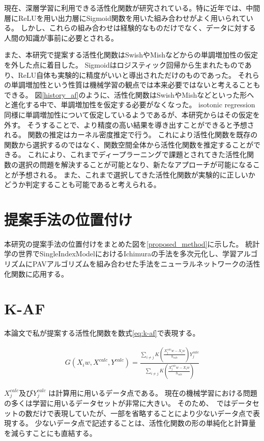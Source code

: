 現在、深層学習に利用できる活性化関数が研究されている。特に近年では、中間層にReLUを用い出力層にSigmoid関数を用いた組み合わせがよく用いられている。
しかし、これらの組み合わせは経験的なものだけでなく、データに対する人間の知識が事前に必要とされる。

また、本研究で提案する活性化関数はSwishやMishなどからの単調増加性の仮定を外した点に着目した。
Sigmoidはロジスティック回帰から生まれたものであり、ReLU自体も実験的に精度がいいと導出されただけのものであった。
それらの単調増加性という性質は機械学習の観点では本来必要ではないと考えることもできる。
図\ref{history_af}のように、活性化関数はSwishやMishなどといった形へと進化する中で、単調増加性を仮定する必要がなくなった。
isotonic regression同様に単調増加性について仮定しているようであるが、本研究からはその仮定を外す。
そうすることで、より精度の高い結果を導き出すことができると予想される。
関数の推定はカーネル密度推定で行う。
これにより活性化関数を既存の関数から選択するのではなく、関数空間全体から活性化関数を推定することができる。
これにより、これまでディープラーニングで課題とされてきた活性化関数の選択の問題を解決することが可能となり、新たなアプローチが可能になることが予想される。
また、これまで選択してきた活性化関数が実験的に正しいかどうか判定することも可能であると考えられる。


\section{提案手法の位置付け}
\label {position_proposed}

本研究の提案手法の位置付けをまとめた図を\ref{proposed_method}に示した。
統計学の世界でSingleIndexModelにおけるIchimuraの手法を多次元化し、学習アルゴリズムにPAVアルゴリズムを組み合わせた手法をニューラルネットワークの活性化関数に応用する。



\section{K-AF}
\label {math}
本論文で私が提案する活性化関数を数式\ref{eq:k-af}で表現する。

\begin{eqnarray}
G(X_iw, X^{calc}, Y^{calc})=\frac{\sum_{i\neq j} K\left(\frac{X^{calc}_j w - X_i w}{h_{calc}}\right)Y^{calc}_j}{\sum_{i\neq j} K\left(\frac{X^{calc}_j w - X_i w}{h_{calc}}\right)}
\label{eq:k-af}
\end{eqnarray}


$ X^{calc}_j $及び$ Y^{calc}_j $ は計算用に用いるデータ点である。
現在の機械学習における問題の多くは学習に用いるデータセットが非常に大きい。
そのため、~\cite{ichimura}ではデータセットの数だけで表現していたが、一部を省略することにより少ないデータ点で表現する。
少ないデータ点で記述することは、活性化関数の形の単純化と計算量を減らすことにも直結する。

